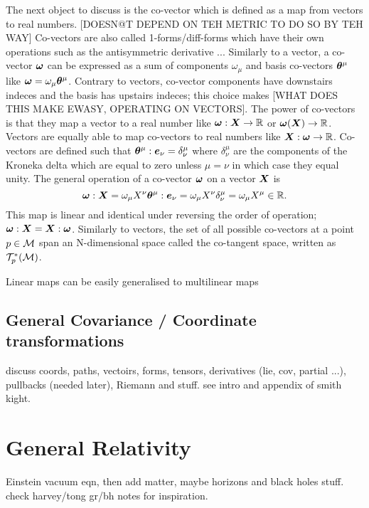The next object to discuss is the co-vector which is defined as a map from vectors to real numbers. [DOESN@T DEPEND ON TEH METRIC TO DO SO BY TEH WAY] Co-vectors are also called 1-forms/diff-forms which have their own operations such as the antisymmetric derivative ... Similarly to a vector, a co-vector $\boldsymbol{\omega}$ can be expressed as a sum of components $\omega_\mu$ and basis co-vectors $\boldsymbol{\theta}^\mu$ like $\boldsymbol{\omega} = \omega_\mu \boldsymbol{\theta}^\mu$. Contrary to vectors, co-vector components have downstairs indeces and the basis has upstairs indeces; this choice makes [WHAT DOES THIS MAKE EWASY, OPERATING ON VECTORS]. The power of co-vectors is that they map a vector to a real number like $\boldsymbol{\omega}:\boldsymbol{X} \rightarrow \mathbb{R}$ or $\boldsymbol{\omega}(\boldsymbol{X}) \rightarrow \mathbb{R}$. Vectors are equally able to map co-vectors to real numbers like $\boldsymbol{X}:\boldsymbol{\omega}\rightarrow\mathbb{R}$. Co-vectors are defined such that $\boldsymbol{\theta}^\mu : \boldsymbol{e}_\nu = \delta^\mu_\nu$ where $\delta^\mu_\nu$ are the components of the Kroneka delta which are equal to zero unless $\mu=\nu$ in which case they equal unity. The general operation of a co-vector $\boldsymbol{\omega}$ on a vector $\boldsymbol{X}$ is
\begin{equation}
\boldsymbol{\omega}: \boldsymbol{X} = \omega_\mu X^\nu \boldsymbol{\theta}^\mu:\boldsymbol{e}_\nu = \omega_\mu X^\nu \delta^\mu_\nu = \omega_\mu X^\mu \in \mathbb{R}.
\end{equation}
This map is linear and identical under reversing the order of operation; $\boldsymbol{\omega} : \boldsymbol{X} = \boldsymbol{X} : \boldsymbol{\omega}$. Similarly to vectors, the set of all possible co-vectors at a point $p\in\mathcal{M}$ span an N-dimensional space called the co-tangent space, written as $\mathcal{T}^*_p(\mathcal{M})$.

Linear maps can be easily generalised to multilinear maps

\subsection{General Covariance / Coordinate transformations}

discuss coords, paths, vectoirs, forms, tensors, derivatives (lie, cov, partial ...), pullbacks (needed later), Riemann and stuff. see intro and appendix of smith kight.

\section{General Relativity}
Einstein vacuum eqn, then add matter, maybe horizons and black holes stuff. check harvey/tong gr/bh notes for inspiration.


